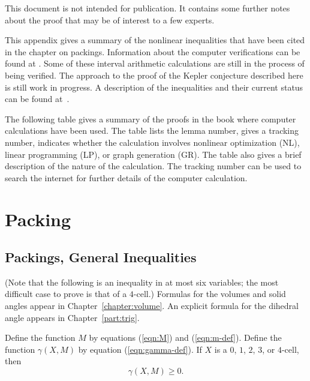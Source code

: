  
\begin{note}%
  This document is not intended for publication.  It contains some
  further notes about the proof that may be of interest to a few
  experts.
\end{note}

\begin{note}%
This appendix gives a summary of the nonlinear inequalities that have
been cited in the chapter on packings.  Information about the computer
verifications can be found at \cite{hales:2009:nonlinear}.  Some
of these interval arithmetic calculations are still in the process
of being verified.  The approach to the proof of the Kepler
conjecture described here is still work in progress.  A description
of the inequalities and their current status can be found
at~\cite{hales:2009:nonlinear}.
\end{note}


\begin{note}
The following table gives a summary of the proofs in the book where
computer calculations have been used.  The table lists the lemma
number, gives a tracking number, indicates whether the calculation
involves nonlinear optimization (NL), linear programming (LP), or
graph generation (GR).  The table also gives a brief description of
the nature of the calculation.  The tracking number can be used to
search the internet for further details of the computer calculation.
\end{note}


\chapter{Packing}


\section{Packings, General Inequalities}


(Note that the following is an inequality in at most six variables; the most
difficult case to prove is that of a $4$-cell.)  Formulas for the
volumes and solid angles appear in Chapter~\ref{chapter:volume}.  An
explicit formula for the dihedral angle appears in
Chapter~\ref{part:trig}.


\begin{calculation}\label{calc:marchal}
% 
Define the function $M$ by equations (\ref{eqn:M}) and
(\ref{eqn:m-def}).  Define the function $\gamma(X,M)$ by equation
(\ref{eqn:gamma-def}).  If $X$ is a $0$, $1$, $2$, $3$, or $4$-cell,
then
\begin{displaymath}
\gamma(X,M)\ge 0.
\end{displaymath}
\end{calculation}

